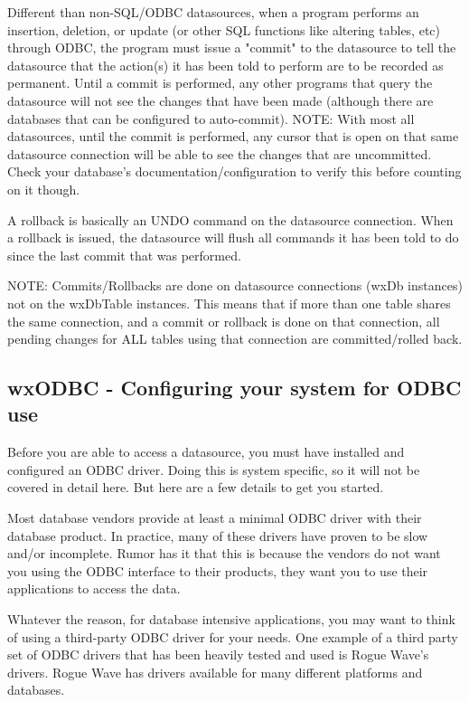 Different than non-SQL/ODBC datasources, when a program performs an 
insertion, deletion, or update (or other SQL functions like altering 
tables, etc) through ODBC, the program must issue a "commit" to the 
datasource to tell the datasource that the action(s) it has been told to 
perform are to be recorded as permanent.  Until a commit is performed, 
any other programs that query the datasource will not see the changes that 
have been made (although there are databases that can be configured to 
auto-commit).  NOTE: With most all datasources, until the commit is 
performed, any cursor that is open on that same datasource connection 
will be able to see the changes that are uncommitted.  Check your 
database's documentation/configuration to verify this before counting on it 
though.

A rollback is basically an UNDO command on the datasource connection.  When 
a rollback is issued, the datasource will flush all commands it has been told 
to do since the last commit that was performed.

NOTE: Commits/Rollbacks are done on datasource connections (wxDb instances) 
not on the wxDbTable instances.  This means that if more than one table 
shares the same connection, and a commit or rollback is done on that 
connection, all pending changes for ALL tables using that connection are 
committed/rolled back.



\subsection{wxODBC - Configuring your system for ODBC use}\label{wxodbcconfiguringyoursystem}

Before you are able to access a datasource, you must have installed and 
configured an ODBC driver.  Doing this is system specific, so it will not be 
covered in detail here.  But here are a few details to get you started.

Most database vendors provide at least a minimal ODBC driver with their 
database product.  In practice, many of these drivers have proven to be slow 
and/or incomplete.  Rumor has it that this is because the vendors do not want 
you using the ODBC interface to their products, they want you to use their 
applications to access the data.  

Whatever the reason, for database intensive applications, you may want to 
think of using a third-party ODBC driver for your needs.  One example of a 
third party set of ODBC drivers that has been heavily tested and used is 
Rogue Wave's drivers.  Rogue Wave has drivers available for many different 
platforms and databases.
 
